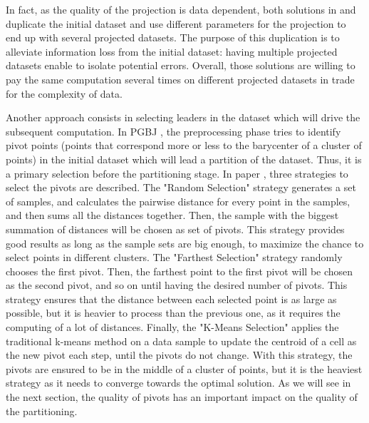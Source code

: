 In fact, as the quality of the projection is data dependent, both solutions in \cite{Zhang:2012:EPK:2247596.2247602} and 
\cite{Stupar10rankreduce-} duplicate the initial dataset and use different parameters for the projection to end up with 
several projected datasets. The purpose of this duplication is to alleviate information loss from the initial dataset: having 
multiple projected datasets enable to isolate potential errors.
Overall, those solutions are willing to pay the same computation several times on different projected datasets in trade for the complexity of data. 
\vspace{2pt}

Another approach consists in selecting leaders in the dataset which will drive the subsequent computation.
In PGBJ \cite{Lu:2012:EPK:2336664.2336674}, the preprocessing phase tries to identify pivot points (points that correspond 
more or less to the barycenter of a cluster of points) in the initial dataset which will lead a partition of the dataset. Thus, 
it is a primary selection before the partitioning stage. In paper \cite{Lu:2012:EPK:2336664.2336674}, three strategies to 
select the pivots are described.  
The "Random Selection" strategy generates a set of samples, and calculates the pairwise distance for every point in the 
samples, and then sums all the distances together. Then, the sample with the biggest summation of distances will be chosen as 
set of pivots. This strategy provides good results as long as the sample sets are big enough, to maximize the chance to select 
points in different clusters. 
The "Farthest Selection" strategy randomly chooses the first pivot. Then, the farthest point to the first pivot will be chosen 
as the second pivot, and so on until having the desired number of pivots. This strategy ensures 
that the distance between each selected point is as large as possible, but it is heavier to process than the previous one, as 
it requires the computing of a lot of distances. 
Finally, the "K-Means Selection" applies the 
traditional k-means method on a data sample to update the centroid of a cell as the new pivot each step, until the pivots do 
not change. With this strategy, the pivots are ensured to be in the middle of a cluster of points, but it is the heaviest 
strategy as it needs to converge towards the optimal solution.
As we will see in the next section, the quality of pivots has an important impact on the quality of the partitioning.


